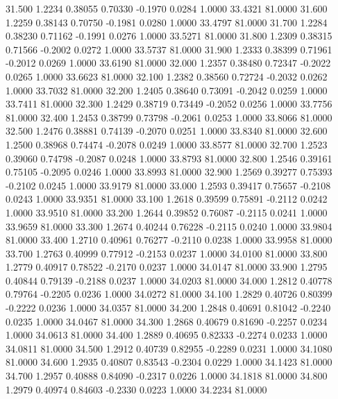   31.500   1.2234   0.38055   0.70330  -0.1970   0.0284   1.0000  33.4321  81.0000
  31.600   1.2259   0.38143   0.70750  -0.1981   0.0280   1.0000  33.4797  81.0000
  31.700   1.2284   0.38230   0.71162  -0.1991   0.0276   1.0000  33.5271  81.0000
  31.800   1.2309   0.38315   0.71566  -0.2002   0.0272   1.0000  33.5737  81.0000
  31.900   1.2333   0.38399   0.71961  -0.2012   0.0269   1.0000  33.6190  81.0000
  32.000   1.2357   0.38480   0.72347  -0.2022   0.0265   1.0000  33.6623  81.0000
  32.100   1.2382   0.38560   0.72724  -0.2032   0.0262   1.0000  33.7032  81.0000
  32.200   1.2405   0.38640   0.73091  -0.2042   0.0259   1.0000  33.7411  81.0000
  32.300   1.2429   0.38719   0.73449  -0.2052   0.0256   1.0000  33.7756  81.0000
  32.400   1.2453   0.38799   0.73798  -0.2061   0.0253   1.0000  33.8066  81.0000
  32.500   1.2476   0.38881   0.74139  -0.2070   0.0251   1.0000  33.8340  81.0000
  32.600   1.2500   0.38968   0.74474  -0.2078   0.0249   1.0000  33.8577  81.0000
  32.700   1.2523   0.39060   0.74798  -0.2087   0.0248   1.0000  33.8793  81.0000
  32.800   1.2546   0.39161   0.75105  -0.2095   0.0246   1.0000  33.8993  81.0000
  32.900   1.2569   0.39277   0.75393  -0.2102   0.0245   1.0000  33.9179  81.0000
  33.000   1.2593   0.39417   0.75657  -0.2108   0.0243   1.0000  33.9351  81.0000
  33.100   1.2618   0.39599   0.75891  -0.2112   0.0242   1.0000  33.9510  81.0000
  33.200   1.2644   0.39852   0.76087  -0.2115   0.0241   1.0000  33.9659  81.0000
  33.300   1.2674   0.40244   0.76228  -0.2115   0.0240   1.0000  33.9804  81.0000
  33.400   1.2710   0.40961   0.76277  -0.2110   0.0238   1.0000  33.9958  81.0000
  33.700   1.2763   0.40999   0.77912  -0.2153   0.0237   1.0000  34.0100  81.0000
  33.800   1.2779   0.40917   0.78522  -0.2170   0.0237   1.0000  34.0147  81.0000
  33.900   1.2795   0.40844   0.79139  -0.2188   0.0237   1.0000  34.0203  81.0000
  34.000   1.2812   0.40778   0.79764  -0.2205   0.0236   1.0000  34.0272  81.0000
  34.100   1.2829   0.40726   0.80399  -0.2222   0.0236   1.0000  34.0357  81.0000
  34.200   1.2848   0.40691   0.81042  -0.2240   0.0235   1.0000  34.0467  81.0000
  34.300   1.2868   0.40679   0.81690  -0.2257   0.0234   1.0000  34.0613  81.0000
  34.400   1.2889   0.40695   0.82333  -0.2274   0.0233   1.0000  34.0811  81.0000
  34.500   1.2912   0.40739   0.82955  -0.2289   0.0231   1.0000  34.1080  81.0000
  34.600   1.2935   0.40807   0.83543  -0.2304   0.0229   1.0000  34.1423  81.0000
  34.700   1.2957   0.40888   0.84090  -0.2317   0.0226   1.0000  34.1818  81.0000
  34.800   1.2979   0.40974   0.84603  -0.2330   0.0223   1.0000  34.2234  81.0000
